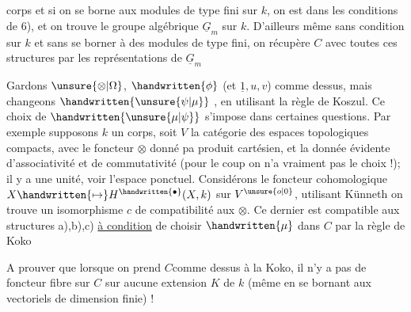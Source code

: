 

corps et si on se borne aux modules de type fini sur $k$, on est dans les conditions de 6), et on trouve le groupe algébrique $\underline{G}_m$ sur $k$. D'ailleurs même sans condition sur $k$ et sans se borner à des modules de type fini, on récupère $C$ avec toutes ces structures par les représentations de $\underline{G}_m$\handwritten{\unsure{!|/}}

Gardons $\unsure{\otimes|\Omega}$, $\handwritten{\phi}$ (et $\underline{1},u,v$) comme dessus, mais changeons $\handwritten{\unsure{\psi|\mu}}$ , en  utilisant la règle de Koszul. Ce choix de $\handwritten{\unsure{\mu|\psi}}$ s'impose dans certaines questions. Par exemple supposons $k$ un corps,  soit $V$ la catégorie des espaces topologiques compacts, avec le foncteur $\otimes$ donné pa produit cartésien, et la donnée évidente d'associativité et de commutativité (pour le coup on n'a vraiment pas le choix !); il y a une unité,  voir l'espace ponctuel. Considérons le foncteur cohomologique $X\handwritten{\mapsto}H^{\handwritten{\bullet}}(X,k)$ sur $V^{\unsure{o|0}}$, utilisant Künneth on trouve un isomorphisme $c$ de compatibilité aux $\otimes$. Ce dernier est compatible aux structures a),b),c) \uline{à condition} de choisir $\handwritten{\mu}$ dans $C$ par la règle de Koko\handwritten{!}

A prouver que lorsque on prend $C$comme dessus à la Koko, il n'y a pas de foncteur fibre sur $C$ sur aucune extension $K$ de $k$ (même en se bornant aux vectoriels de dimension finie) !



